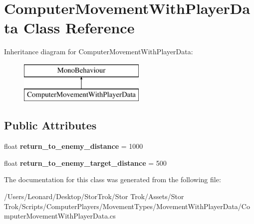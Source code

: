 \hypertarget{class_computer_movement_with_player_data}{}\section{Computer\+Movement\+With\+Player\+Data Class Reference}
\label{class_computer_movement_with_player_data}
Inheritance diagram for Computer\+Movement\+With\+Player\+Data\+:\begin{figure}[H]
\begin{center}
\leavevmode
\includegraphics[height=2.000000cm]{class_computer_movement_with_player_data}
\end{center}
\end{figure}
\subsection*{Public Attributes}
\begin{DoxyCompactItemize}
\item 
\mbox{\label{class_computer_movement_with_player_data_ae59e2f2887983cfce860f28a383938b2}} 
float {\bfseries return\+\_\+to\+\_\+enemy\+\_\+distance} = 1000
\item 
\mbox{\label{class_computer_movement_with_player_data_a367804093dad6261c476c943b1115de7}} 
float {\bfseries return\+\_\+to\+\_\+enemy\+\_\+target\+\_\+distance} = 500
\end{DoxyCompactItemize}


The documentation for this class was generated from the following file\+:\begin{DoxyCompactItemize}
\item 
/\+Users/\+Leonard/\+Desktop/\+Stor\+Trok/\+Stor Trok/\+Assets/\+Stor Trok/\+Scripts/\+Computer\+Players/\+Movement\+Types/\+Movement\+With\+Player\+Data/Computer\+Movement\+With\+Player\+Data.\+cs\end{DoxyCompactItemize}
